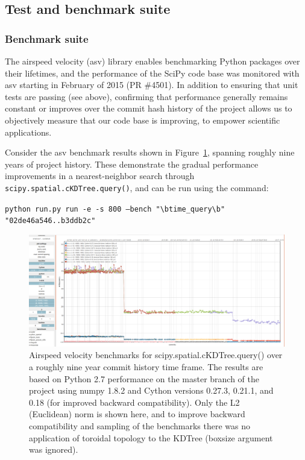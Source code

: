 \documentclass[fleqn,10pt]{wlscirep}
\begin{document}
\subsection*{Test and benchmark suite}

    \subsubsection*{Benchmark suite}

    The airspeed velocity (asv) library enables benchmarking Python packages over their lifetimes, and the performance of the SciPy
    code base was monitored with asv starting in February of 2015 (PR \#4501). In addition to ensuring that unit tests are passing (see above),
    confirming that performance generally remains constant or improves over the commit hash history of the project allows us to objectively
    measure that our code base is improving, to empower scientific applications.

    Consider the asv benchmark results shown in Figure~\ref{fig:asvbench}, spanning roughly nine years of project history. These demonstrate the gradual performance
    improvements in a nearest-neighbor search through \texttt{scipy.spatial.cKDTree.query()}, and can be run using the command:


    \texttt{python run.py run -e -s 800 --bench "\textbackslash btime\_query\textbackslash b" "02de46a546..b3ddb2c"}

    \begin{figure}[H]
        \centering
        \includegraphics[width=\textwidth]{static/asv_time_query_ckdtree}
        \caption{Airspeed velocity benchmarks for scipy.spatial.cKDTree.query() over a roughly nine year commit history time frame. The results are based on Python 2.7 performance on the master branch of the project using numpy 1.8.2 and Cython versions 0.27.3, 0.21.1, and 0.18 (for improved backward compatibility). Only the L2 (Euclidean) norm is shown here, and to improve backward compatibility and sampling of the benchmarks there was no application of toroidal topology to the KDTree (boxsize argument was ignored).}
        \label{fig:asvbench}
    \end{figure}
\end{document}
